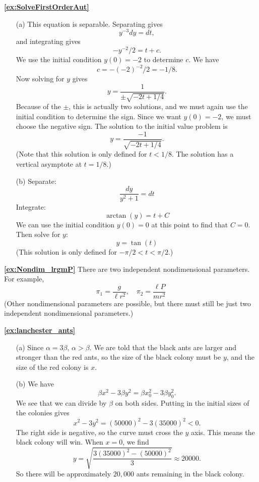 \medskip
\textbf{\ref{ex:SolveFirstOrderAut}}
\begin{enumerate}
\item[(a)]
This equation is separable.  Separating gives
\[
   y^{-3}dy = dt,
\]
and integrating gives
\[
  -y^{-2}/2 = t + c.
\]
We use the initial condition $y(0)=-2$ to determine $c$.
We have
\[
  c = -(-2)^{-2}/2 = -1/8.
\]
Now solving for $y$ gives
\[
  y = \frac{1}{\pm\sqrt{-2t+1/4}}.
\]
Because of the $\pm$, this is actually two solutions, and we must again use
the initial condition to determine the sign.  Since we want $y(0)=-2$, we must
choose the negative sign.  The solution to the initial value problem is
\[
  y = \frac{-1}{\sqrt{-2t+1/4}}.
\]
(Note that this solution is only defined for $t < 1/8$.  The
solution has a vertical asymptote at $t=1/8$.)
\item[(b)]
Separate:
\[
   \frac{dy}{y^2+1} = dt
\]
Integrate:
\[
  \arctan(y) = t + C
\]
We can use the initial condition $y(0)=0$ at this point to find that
$C=0$.
Then solve for $y$:
\[
  y = \tan(t)
\]
(This solution is only defined for $-\pi/2 < t < \pi/2$.)
\end{enumerate}

\medskip
\textbf{\ref{ex:Nondim_lrgmP}}
There are two independent nondimensional parameters.
For example,
\[
   \pi_1 = \frac{g}{\ell r^2}, \quad \pi_2 = \frac{\ell P}{mr^2}
\]
(Other nondimensional parameters are possible, but there
must still be just two independent nondimensional parameters.)


\newpage
\textbf{\ref{ex:lanchester_ants}}
\begin{enumerate}
\item[(a)] Since $\alpha = 3\beta$, $\alpha > \beta$.
We are told that the black ants are larger and stronger than
the red ants, so the size of the black colony must be $y$,
and the size of the red colony is $x$.
\item[(b)] We have
\[
   \beta x^2 - 3\beta y^2 = \beta x_0^2 -3\beta y_0^2.
\]
We see that we can divide by $\beta$ on both sides.
Putting in the initial sizes of the colonies gives
\[
   x^2-3y^2 = (50000)^2-3(35000)^2 < 0.
\]
The right side is negative, so the curve must cross the $y$
axis. This means the black colony will win.
  When $x=0$, we find
\[
  y = \sqrt{\frac{3(35000)^2-(50000)^2}{3}} \approx 20000.
\]
So there will be approximately $20,000$ ants remaining in
the black colony.
\end{enumerate}

